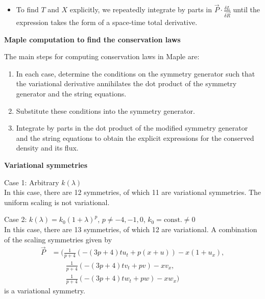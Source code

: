 \documentclass[landscape]{slides}
\def\myemph#1{\textcolor{blue}{\em #1}}
\def\const{\text{const.}}
\begin{document}
\begin{itemize}
\newpage

where 
\[
T = \vec{P} \cdot \partial_{\vec{R}_t} L - A
\]
is the \myemph{conserved density}, 
and 
\[
X = \vec{P} \cdot \partial_{\vec{R}_x} L - B
\]
is its \myemph{flux}. 
\item
To find $T$ and $X$ explicitly, 
we repeatedly integrate by parts in $ \vec{P} \cdot \frac{\delta L}{\delta \vec{R}}$ 
until the expression takes the form of a space-time total derivative.
\end{itemize}
\hfil

\newpage

\textbf{Maple computation to find the conservation laws}


The main steps for computing conservation laws in Maple are:
\begin{enumerate}
\item
In each case, determine the conditions on the symmetry generator such that the variational derivative annihilates the dot product of the symmetry generator and the string equations.
\item
Substitute these conditions into the symmetry generator.
\item 
Integrate by parts in the dot product of the modified symmetry generator and the string equations to obtain the explicit expressions for the conserved density and its flux.
\end{enumerate}

\newpage 

\begin{center}
\textbf{Variational symmetries}
\end{center}

Case 1: Arbitrary $k(\lambda)$\\
In this case, there are 12 symmetries, of which 11 are variational symmetries. The uniform scaling is not variational.

Case 2: $k(\lambda) = k_0 (1+\lambda)^{p}$,
\quad
$p \neq -4, -1, 0$, 
\quad
$k_0 = \const \neq 0$\\
In this case, there are 13 symmetries, of which 12 are variational. A combination of the scaling symmetries given by
\[\begin{aligned}
\vec{P} &= 
(
\frac{1}{p+4} ( -(3p + 4) t u_t + p (x+u)) - x (1 + u_x), \\
& \quad \quad \frac{1}{p+4} ( -(3p + 4) t v_t + p v) - x v_x, \\
& \quad \quad \frac{1}{p+4} ( -(3p + 4) t w_t + p w) - x w_x
)
\end{aligned}\]
is a variational symmetry.
\end{document}
